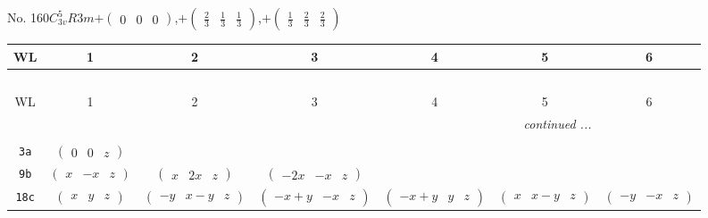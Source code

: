 \documentclass[fleqn,9pt,landscape]{jsarticle}
\begin{document}
\newpage
No. 160\quad$C_{3v}^{5}$\quad$R3m$\quad[ trigonal ]\quad$+\begin{pmatrix} 0 & 0 & 0 \end{pmatrix}$,\quad $+\begin{pmatrix} \frac{2}{3} & \frac{1}{3} & \frac{1}{3} \end{pmatrix}$,\quad $+\begin{pmatrix} \frac{1}{3} & \frac{2}{3} & \frac{2}{3} \end{pmatrix}$
\begin{center}
\renewcommand{\arraystretch}{1.2}
\begin{longtable}{ccccccc}
 \hline \hline
WL & 1 & 2 & 3 & 4 & 5 & 6 \\ \hline \endfirsthead

\multicolumn{6}{l}{\tablename\ \thetable{}} \\
 \hline \hline
WL & 1 & 2 & 3 & 4 & 5 & 6 \\ \hline \endhead

 \hline \hline
\multicolumn{6}{r}{\footnotesize\it continued ...} \\ \endfoot

 \hline \hline
\multicolumn{6}{r}{} \\ \endlastfoot

{\tt 3a} & $ \begin{pmatrix} 0 & 0 & z \end{pmatrix} $ & $  $ & $  $ & $  $ & $  $ & $  $ \\ \hline
{\tt 9b} & $ \begin{pmatrix} x & - x & z \end{pmatrix} $ & $ \begin{pmatrix} x & 2 x & z \end{pmatrix} $ & $ \begin{pmatrix} - 2 x & - x & z \end{pmatrix} $ & $  $ & $  $ & $  $ \\ \hline
{\tt 18c} & $ \begin{pmatrix} x & y & z \end{pmatrix} $ & $ \begin{pmatrix} - y & x - y & z \end{pmatrix} $ & $ \begin{pmatrix} - x + y & - x & z \end{pmatrix} $ & $ \begin{pmatrix} - x + y & y & z \end{pmatrix} $ & $ \begin{pmatrix} x & x - y & z \end{pmatrix} $ & $ \begin{pmatrix} - y & - x & z \end{pmatrix} $ \\
\end{longtable}
\end{center}
\end{document}
